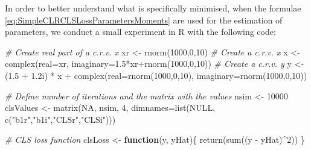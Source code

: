 \documentclass[
]{book}
\newenvironment{Shaded}{\begin{snugshade}}{\end{snugshade}}
\newcommand{\AttributeTok}[1]{\textcolor[rgb]{0.77,0.63,0.00}{#1}}
\newcommand{\CommentTok}[1]{\textcolor[rgb]{0.56,0.35,0.01}{\textit{#1}}}
\newcommand{\ConstantTok}[1]{\textcolor[rgb]{0.00,0.00,0.00}{#1}}
\newcommand{\ControlFlowTok}[1]{\textcolor[rgb]{0.13,0.29,0.53}{\textbf{#1}}}
\newcommand{\DecValTok}[1]{\textcolor[rgb]{0.00,0.00,0.81}{#1}}
\newcommand{\FloatTok}[1]{\textcolor[rgb]{0.00,0.00,0.81}{#1}}
\newcommand{\FunctionTok}[1]{\textcolor[rgb]{0.00,0.00,0.00}{#1}}
\newcommand{\NormalTok}[1]{#1}
\newcommand{\OtherTok}[1]{\textcolor[rgb]{0.56,0.35,0.01}{#1}}
\newcommand{\SpecialCharTok}[1]{\textcolor[rgb]{0.00,0.00,0.00}{#1}}
\newcommand{\StringTok}[1]{\textcolor[rgb]{0.31,0.60,0.02}{#1}}
\begin{document}
In order to better understand what is specifically minimised, when the formulae \eqref{eq:SimpleCLRCLSLossParametersMoments} are used for the estimation of parameters, we conduct a small experiment in R with the following code:

\begin{Shaded}
\begin{Highlighting}[]
\CommentTok{\# Create real part of a c.r.v. x}
\NormalTok{xr }\OtherTok{\textless{}{-}} \FunctionTok{rnorm}\NormalTok{(}\DecValTok{1000}\NormalTok{,}\DecValTok{0}\NormalTok{,}\DecValTok{10}\NormalTok{)}
\CommentTok{\# Create a c.r.v. x}
\NormalTok{x }\OtherTok{\textless{}{-}} \FunctionTok{complex}\NormalTok{(}\AttributeTok{real=}\NormalTok{xr, }\AttributeTok{imaginary=}\FloatTok{1.5}\SpecialCharTok{*}\NormalTok{xr}\SpecialCharTok{+}\FunctionTok{rnorm}\NormalTok{(}\DecValTok{1000}\NormalTok{,}\DecValTok{0}\NormalTok{,}\DecValTok{10}\NormalTok{))}
\CommentTok{\# Create a c.r.v. y}
\NormalTok{y }\OtherTok{\textless{}{-}}\NormalTok{ (}\FloatTok{1.5} \SpecialCharTok{+} \FloatTok{1.2}\NormalTok{i) }\SpecialCharTok{*}\NormalTok{ x }\SpecialCharTok{+}
    \FunctionTok{complex}\NormalTok{(}\AttributeTok{real=}\FunctionTok{rnorm}\NormalTok{(}\DecValTok{1000}\NormalTok{,}\DecValTok{0}\NormalTok{,}\DecValTok{10}\NormalTok{), }\AttributeTok{imaginary=}\FunctionTok{rnorm}\NormalTok{(}\DecValTok{1000}\NormalTok{,}\DecValTok{0}\NormalTok{,}\DecValTok{10}\NormalTok{))}

\CommentTok{\# Define number of iterations and the matrix with the values}
\NormalTok{nsim }\OtherTok{\textless{}{-}} \DecValTok{10000}
\NormalTok{clsValues }\OtherTok{\textless{}{-}} \FunctionTok{matrix}\NormalTok{(}\ConstantTok{NA}\NormalTok{, nsim, }\DecValTok{4}\NormalTok{,}
                    \AttributeTok{dimnames=}\FunctionTok{list}\NormalTok{(}\ConstantTok{NULL}\NormalTok{,}
                                  \FunctionTok{c}\NormalTok{(}\StringTok{"b1r"}\NormalTok{,}\StringTok{"b1i"}\NormalTok{,}\StringTok{"CLSr"}\NormalTok{,}\StringTok{"CLSi"}\NormalTok{)))}

\CommentTok{\# CLS loss function}
\NormalTok{clsLoss }\OtherTok{\textless{}{-}} \ControlFlowTok{function}\NormalTok{(y, yHat)\{}
    \FunctionTok{return}\NormalTok{(}\FunctionTok{sum}\NormalTok{((y }\SpecialCharTok{{-}}\NormalTok{ yHat)}\SpecialCharTok{\^{}}\DecValTok{2}\NormalTok{))}
\NormalTok{\}}


\end{Highlighting}
\end{Shaded}
\end{document}
